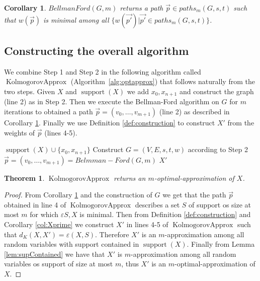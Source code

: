 \documentclass{article}
\newtheorem{theorem}[thm]{Theorem}
\newtheorem{corollary}[thm]{Corollary}
\DeclareMathOperator{\support}{support}
\DeclareMathOperator{\KlmApprox}{KolmogorovApprox}
\begin{document}
\begin{corollary}\label{cor:Bellman}
$BellmanFord(G,m)$ returns a path $\vec{p}\in paths_m(G, s, t)$ such that $w(\vec{p})$ is minimal among all $\{w(\vec{p'}) | \vec{p'}\in paths_m(G, s, t)\}$.
\end{corollary}


\subsection*{Constructing the overall algorithm}

We combine Step 1 and Step 2 in the following algorithm called $\KlmApprox$ (Algorithm~\ref{alg:optapprox}) that follows naturally from the two steps. Given $X$ and $\support(X)$ we add $x_0,x_{n+1}$ and construct the graph (line 2) as in Step 2. Then we execute the Bellman-Ford algorithm on $G$ for $m$ iterations to obtained a path $\vec{p}=(v_0,\dots,v_{m+1})$ (line 2) as described in Corollary \ref{cor:Bellman}. Finally we use Definition \ref{def:construction} to construct $X'$ from the weights of $\vec{p}$ (lines 4-5).






\begin{algorithm}\label{alg:optapprox}
	\DontPrintSemicolon
	$\support(X)\cup \{x_0,x_{n+1}\}$\;
	Construct $G=(V,E,s,t,w)$ according to Step 2 \;
	$\vec{p}=(v_0,\dots,v_{m+1}) = Belmman-Ford(G,m)$  \;
	\Return $X'$\;
	
	\caption{$\KlmApprox (X, m)$}  
	\label{alg:sequence}
\end{algorithm}



\begin{theorem}\label{the:algo}
	$\KlmApprox$ returns an $m$-optimal-approximation of $X$.
\end{theorem}
\begin{proof}
From Corollary \ref{cor:Bellman} and the construction of $G$ we get that the path $\vec{p}$ obtained in line 4 of  $\KlmApprox$ describes a set $S$ of support os size at most $m$ for which $\varepsilon{S,X}$ is minimal. Then from Definition \ref{def:construction} and Corollary \ref{col:Xprime} we construct $X'$ in lines 4-5 of 	$\KlmApprox$ such that $d_K(X,X') = \varepsilon(X,S)$. Therefore $X'$ is an $m$-approximation among all random variables with support contained in $\support(X)$. Finally from Lemma \ref{lem:supContained} we have that $X'$ is  $m$-approximation among all random variables os support of size at most $m$, thus  $X'$ is an $m$-optimal-approximation of $X$.
\end{proof}
\end{document}
